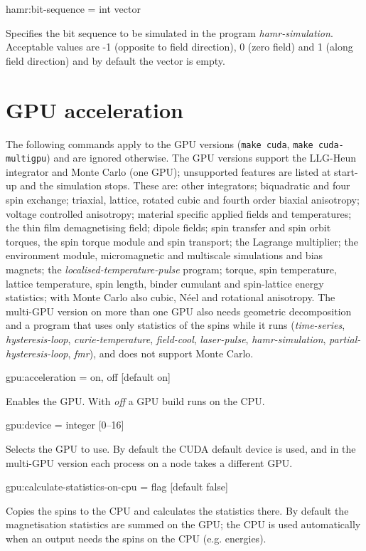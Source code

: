 {\zicf hamr:bit-sequence = int vector}
Specifies the bit sequence to be simulated in the program \textit{hamr-simulation}.
Acceptable values are -1 (opposite to field direction), 0 (zero field) and 1 (along field direction) and by default the vector is empty.

\section*{GPU acceleration}
The following commands apply to the GPU versions (\texttt{make cuda}, \texttt{make cuda-multigpu}) and are ignored otherwise. The GPU versions support the LLG-Heun integrator and Monte Carlo (one GPU); unsupported features are listed at start-up and the simulation stops. These are: other integrators; biquadratic and four spin exchange; triaxial, lattice, rotated cubic and fourth order biaxial anisotropy; voltage controlled anisotropy; material specific applied fields and temperatures; the thin film demagnetising field; dipole fields; spin transfer and spin orbit torques, the spin torque module and spin transport; the Lagrange multiplier; the environment module, micromagnetic and multiscale simulations and bias magnets; the \textit{localised-temperature-pulse} program; torque, spin temperature, lattice temperature, spin length, binder cumulant and spin-lattice energy statistics; with Monte Carlo also cubic, N\'eel and rotational anisotropy. The multi-GPU version on more than one GPU also needs geometric decomposition and a program that uses only statistics of the spins while it runs (\textit{time-series}, \textit{hysteresis-loop}, \textit{curie-temperature}, \textit{field-cool}, \textit{laser-pulse}, \textit{hamr-simulation}, \textit{partial-hysteresis-loop}, \textit{fmr}), and does not support Monte Carlo.

{\zicf gpu:acceleration = on, off [default on]} Enables the GPU. With \textit{off} a GPU build runs on the CPU.

{\zicf gpu:device = integer [0--16]} Selects the GPU to use. By default the CUDA default device is used, and in the multi-GPU version each process on a node takes a different GPU.

{\zicf gpu:calculate-statistics-on-cpu = flag [default false]} Copies the spins to the CPU and calculates the statistics there. By default the magnetisation statistics are summed on the GPU; the CPU is used automatically when an output needs the spins on the CPU (e.g. energies).

